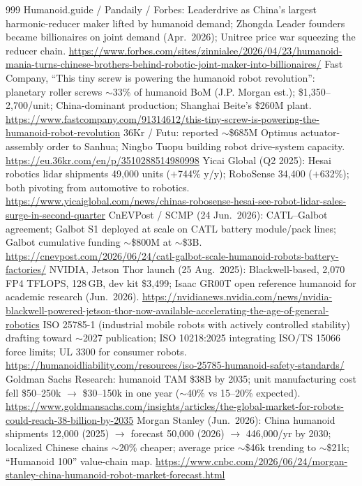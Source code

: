 \begin{thebibliography}{999}
 Humanoid.guide / Pandaily / Forbes: Leaderdrive as China's largest harmonic-reducer maker lifted by humanoid demand; Zhongda Leader founders became billionaires on joint demand (Apr.\ 2026); Unitree price war squeezing the reducer chain. \url{https://www.forbes.com/sites/zinnialee/2026/04/23/humanoid-mania-turns-chinese-brothers-behind-robotic-joint-maker-into-billionaires/}
 Fast Company, ``This tiny screw is powering the humanoid robot revolution'': planetary roller screws $\sim$33\% of humanoid BoM (J.P. Morgan est.); \$1,350--2,700/unit; China-dominant production; Shanghai Beite's \$260M plant. \url{https://www.fastcompany.com/91314612/this-tiny-screw-is-powering-the-humanoid-robot-revolution}
 36Kr / Futu: reported $\sim$\$685M Optimus actuator-assembly order to Sanhua; Ningbo Tuopu building robot drive-system capacity. \url{https://eu.36kr.com/en/p/3510288514980998}
 Yicai Global (Q2 2025): Hesai robotics lidar shipments 49,000 units ($+$744\% y/y); RoboSense 34,400 ($+$632\%); both pivoting from automotive to robotics. \url{https://www.yicaiglobal.com/news/chinas-robosense-hesai-see-robot-lidar-sales-surge-in-second-quarter}
 CnEVPost / SCMP (24 Jun.\ 2026): CATL--Galbot agreement; Galbot S1 deployed at scale on CATL battery module/pack lines; Galbot cumulative funding $\sim$\$800M at $\sim$\$3B. \url{https://cnevpost.com/2026/06/24/catl-galbot-scale-humanoid-robots-battery-factories/}
 NVIDIA, Jetson Thor launch (25 Aug.\ 2025): Blackwell-based, 2,070 FP4 TFLOPS, 128\,GB, dev kit \$3,499; Isaac GR00T open reference humanoid for academic research (Jun.\ 2026). \url{https://nvidianews.nvidia.com/news/nvidia-blackwell-powered-jetson-thor-now-available-accelerating-the-age-of-general-robotics}
 ISO 25785-1 (industrial mobile robots with actively controlled stability) drafting toward $\sim$2027 publication; ISO 10218:2025 integrating ISO/TS 15066 force limits; UL 3300 for consumer robots. \url{https://humanoidliability.com/resources/iso-25785-humanoid-safety-standards/}
 Goldman Sachs Research: humanoid TAM \$38B by 2035; unit manufacturing cost fell \$50--250k $\to$ \$30--150k in one year ($\sim$40\% vs 15--20\% expected). \url{https://www.goldmansachs.com/insights/articles/the-global-market-for-robots-could-reach-38-billion-by-2035}
 Morgan Stanley (Jun.\ 2026): China humanoid shipments 12,000 (2025) $\to$ forecast 50,000 (2026) $\to$ 446,000/yr by 2030; localized Chinese chains $\sim$20\% cheaper; average price $\sim$\$46k trending to $\sim$\$21k; ``Humanoid 100'' value-chain map. \url{https://www.cnbc.com/2026/06/24/morgan-stanley-china-humanoid-robot-market-forecast.html}

\end{thebibliography}
